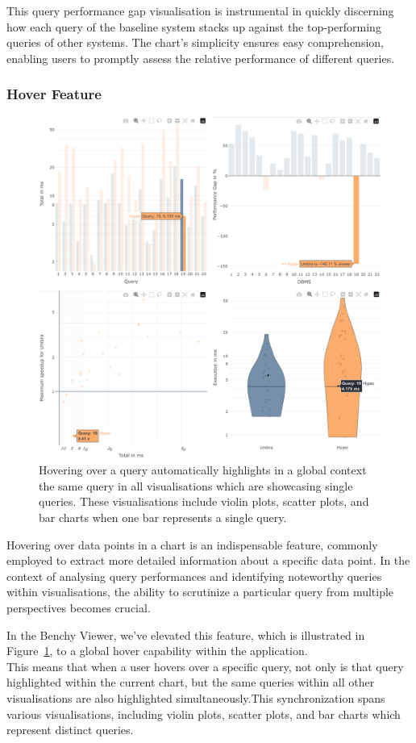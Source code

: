 This query performance gap visualisation is instrumental in quickly discerning how each query of the baseline system stacks up against the top-performing queries of other systems. The chart's simplicity ensures easy comprehension, enabling users to promptly assess the relative performance of different queries.




\subsubsection{Hover Feature}\label{sec:hover-feature}

\begin{figure}[h]
  \centering
  \includegraphics[width=0.6\linewidth]{figures/hover-group.png}
  \caption{Hovering over a query automatically highlights in a global context the same query in all visualisations which are showcasing single queries. These visualisations include violin plots, scatter plots, and bar charts when one bar represents a single query.}
  \label{fig:hover-group}
\end{figure}

Hovering over data points in a chart is an indispensable feature, commonly employed to extract more detailed information about a specific data point. In the context of analysing query performances and identifying noteworthy queries within visualisations, the ability to scrutinize a particular query from multiple perspectives becomes crucial.


 In the Benchy Viewer, we've elevated this feature, which is illustrated in Figure~\ref{fig:hover-group}, to a global hover capability within the application.\\
 This means that when a user hovers over a specific query, not only is that query highlighted within the current chart, but the same queries within all other visualisations are also highlighted simultaneously.This synchronization spans various visualisations, including violin plots, scatter plots, and bar charts which represent distinct queries.



